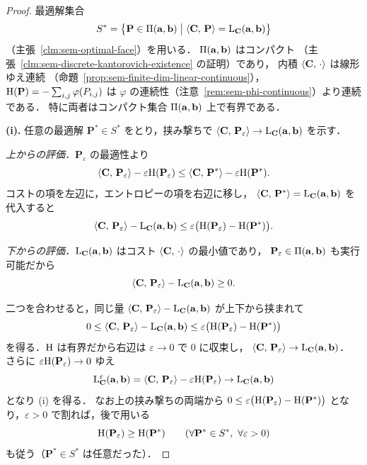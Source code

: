 \begin{proof}
  最適解集合
  \[
    S^* = \bigl\{ \mathbf{P} \in \Pi(\mathbf{a},\mathbf{b}) \bigm|
      \langle \mathbf{C},\, \mathbf{P} \rangle = \mathrm{L}_{\mathbf{C}}(\mathbf{a},\mathbf{b}) \bigr\}
  \]
  （主張~\ref{clm:sem-optimal-face}）を用いる．
  $\Pi(\mathbf{a},\mathbf{b})$ はコンパクト
  （主張~\ref{clm:sem-discrete-kantorovich-existence} の証明）であり，
  内積 $\langle \mathbf{C},\, \cdot \rangle$ は線形ゆえ連続
  （命題~\ref{prop:sem-finite-dim-linear-continuous}），
  $\mathrm{H}(\mathbf{P}) = -\sum_{i,j}\varphi(P_{i,j})$ は
  $\varphi$ の連続性（注意~\ref{rem:sem-phi-continuous}）より連続である．
  特に両者はコンパクト集合 $\Pi(\mathbf{a},\mathbf{b})$ 上で有界である．

  \textbf{(i).}
  任意の最適解 $\mathbf{P}^* \in S^*$ をとり，挟み撃ちで
  $\langle \mathbf{C},\, \mathbf{P}_\varepsilon \rangle \to \mathrm{L}_{\mathbf{C}}(\mathbf{a},\mathbf{b})$ を示す．

  \emph{上からの評価．}$\mathbf{P}_\varepsilon$ の最適性より
  \[
    \langle \mathbf{C},\, \mathbf{P}_\varepsilon \rangle - \varepsilon\mathrm{H}(\mathbf{P}_\varepsilon)
    \leq
    \langle \mathbf{C},\, \mathbf{P}^* \rangle - \varepsilon\mathrm{H}(\mathbf{P}^*).
  \]
  コストの項を左辺に，エントロピーの項を右辺に移し，
  $\langle \mathbf{C},\, \mathbf{P}^* \rangle = \mathrm{L}_{\mathbf{C}}(\mathbf{a},\mathbf{b})$ を代入すると
  \[
    \langle \mathbf{C},\, \mathbf{P}_\varepsilon \rangle - \mathrm{L}_{\mathbf{C}}(\mathbf{a},\mathbf{b})
    \leq
    \varepsilon\bigl(\mathrm{H}(\mathbf{P}_\varepsilon) - \mathrm{H}(\mathbf{P}^*)\bigr).
  \]

  \emph{下からの評価．}$\mathrm{L}_{\mathbf{C}}(\mathbf{a},\mathbf{b})$ はコスト $\langle \mathbf{C},\, \cdot \rangle$ の最小値であり，
  $\mathbf{P}_\varepsilon \in \Pi(\mathbf{a},\mathbf{b})$ も実行可能だから
  \[
    \langle \mathbf{C},\, \mathbf{P}_\varepsilon \rangle - \mathrm{L}_{\mathbf{C}}(\mathbf{a},\mathbf{b}) \geq 0 .
  \]

  二つを合わせると，同じ量
  $\langle \mathbf{C},\, \mathbf{P}_\varepsilon \rangle - \mathrm{L}_{\mathbf{C}}(\mathbf{a},\mathbf{b})$
  が上下から挟まれて
  \[
    0
    \leq
    \langle \mathbf{C},\, \mathbf{P}_\varepsilon \rangle - \mathrm{L}_{\mathbf{C}}(\mathbf{a},\mathbf{b})
    \leq
    \varepsilon\bigl(\mathrm{H}(\mathbf{P}_\varepsilon) - \mathrm{H}(\mathbf{P}^*)\bigr)
  \]
  を得る．$\mathrm{H}$ は有界だから右辺は $\varepsilon \to 0$ で $0$ に収束し，
  $\langle \mathbf{C},\, \mathbf{P}_\varepsilon \rangle \to \mathrm{L}_{\mathbf{C}}(\mathbf{a},\mathbf{b})$．
  さらに $\varepsilon\mathrm{H}(\mathbf{P}_\varepsilon) \to 0$ ゆえ
  \[
    \mathrm{L}_{\mathbf{C}}^\varepsilon(\mathbf{a},\mathbf{b})
    = \langle \mathbf{C},\, \mathbf{P}_\varepsilon \rangle - \varepsilon\mathrm{H}(\mathbf{P}_\varepsilon)
    \to \mathrm{L}_{\mathbf{C}}(\mathbf{a},\mathbf{b})
  \]
  となり (i) を得る．
  なお上の挟み撃ちの両端から
  $0 \leq \varepsilon\bigl(\mathrm{H}(\mathbf{P}_\varepsilon) - \mathrm{H}(\mathbf{P}^*)\bigr)$
  となり，$\varepsilon > 0$ で割れば，後で用いる
  \[
    \mathrm{H}(\mathbf{P}_\varepsilon) \geq \mathrm{H}(\mathbf{P}^*)
    \qquad (\forall \mathbf{P}^* \in S^*,\ \forall \varepsilon > 0)
  \]
  も従う（$\mathbf{P}^* \in S^*$ は任意だった）．


\end{proof}
